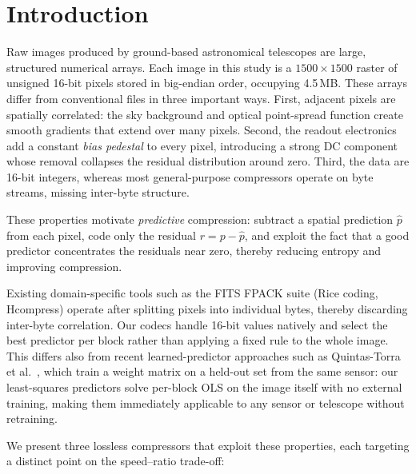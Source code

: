 \section{Introduction}
\label{sec:intro}

Raw images produced by ground-based astronomical telescopes are large,
structured numerical arrays. Each image in this study is a $1500\times1500$
raster of unsigned 16-bit pixels stored in big-endian order, occupying
4.5\,MB. These arrays differ from conventional files in three important ways.
First, adjacent pixels are spatially correlated: the sky background and optical
point-spread function create smooth gradients that extend over many pixels.
Second, the readout electronics add a constant \emph{bias pedestal} to every
pixel, introducing a strong DC component whose removal collapses the residual
distribution around zero. Third, the data are 16-bit integers, whereas most
general-purpose compressors operate on byte streams, missing inter-byte
structure.

These properties motivate \emph{predictive} compression: subtract a spatial
prediction $\hat{p}$ from each pixel, code only the residual $r = p - \hat{p}$,
and exploit the fact that a good predictor concentrates the residuals near
zero, thereby reducing entropy and improving compression.

Existing domain-specific tools such as the FITS FPACK suite (Rice coding,
Hcompress) operate after splitting pixels into individual bytes, thereby
discarding inter-byte correlation. Our codecs handle 16-bit values natively
and select the best predictor per block rather than applying a fixed rule
to the whole image. This differs also from recent learned-predictor approaches
such as Quintas-Torra et al.~\cite{quintas2026}, which train a weight matrix
on a held-out set from the same sensor: our least-squares predictors solve
per-block OLS on the image itself with no external training, making them
immediately applicable to any sensor or telescope without retraining.

We present three lossless compressors that exploit these properties, each
targeting a distinct point on the speed--ratio trade-off:

